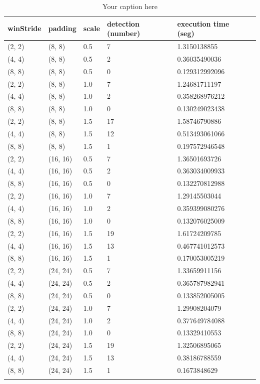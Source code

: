 \begin{longtable}{|l|l|l|l|l|l|} 
	\hline
	\textbf{winStride} & \textbf{padding} & \textbf{scale} & \textbf{detection (number)} & \textbf{execution time (seg)} \\ \hline
	(2, 2) & (8, 8) & 0.5 & 7 & 1.3150138855 \\ \hline
	(4, 4) & (8, 8) & 0.5 & 2 & 0.36035490036 \\ \hline
	(8, 8) & (8, 8) & 0.5 & 0 & 0.129312992096 \\ \hline
	(2, 2) & (8, 8) & 1.0 & 7 & 1.24681711197 \\ \hline
	(4, 4) & (8, 8) & 1.0 & 2 & 0.358268976212 \\ \hline
	(8, 8) & (8, 8) & 1.0 & 0 & 0.130249023438 \\ \hline
	(2, 2) & (8, 8) & 1.5 & 17 & 1.58746790886 \\ \hline
	(4, 4) & (8, 8) & 1.5 & 12 & 0.513493061066 \\ \hline
	(8, 8) & (8, 8) & 1.5 & 1 & 0.197572946548 \\ \hline
	(2, 2) & (16, 16) & 0.5 & 7 & 1.36501693726 \\ \hline
	(4, 4) & (16, 16) & 0.5 & 2 & 0.363034009933 \\ \hline
	(8, 8) & (16, 16) & 0.5 & 0 & 0.132270812988 \\ \hline
	(2, 2) & (16, 16) & 1.0 & 7 & 1.29145503044 \\ \hline
	(4, 4) & (16, 16) & 1.0 & 2 & 0.359399080276 \\ \hline
	(8, 8) & (16, 16) & 1.0 & 0 & 0.132076025009 \\ \hline
	(2, 2) & (16, 16) & 1.5 & 19 & 1.61724209785 \\ \hline
	(4, 4) & (16, 16) & 1.5 & 13 & 0.467741012573 \\ \hline
	(8, 8) & (16, 16) & 1.5 & 1 & 0.170053005219 \\ \hline
	(2, 2) & (24, 24) & 0.5 & 7 & 1.33659911156 \\ \hline
	(4, 4) & (24, 24) & 0.5 & 2 & 0.365787982941 \\ \hline
	(8, 8) & (24, 24) & 0.5 & 0 & 0.133852005005 \\ \hline
	(2, 2) & (24, 24) & 1.0 & 7 & 1.29908204079 \\ \hline
	(4, 4) & (24, 24) & 1.0 & 2 & 0.377649784088 \\ \hline
	(8, 8) & (24, 24) & 1.0 & 0 & 0.13329410553 \\ \hline
	(2, 2) & (24, 24) & 1.5 & 19 & 1.32506895065 \\ \hline
	(4, 4) & (24, 24) & 1.5 & 13 & 0.38186788559 \\ \hline
	(8, 8) & (24, 24) & 1.5 & 1 & 0.1673848629 \\ \hline
	
	
	\caption{Your caption here} %
	\label{tab:myfirstlongtable}
\end{longtable}











